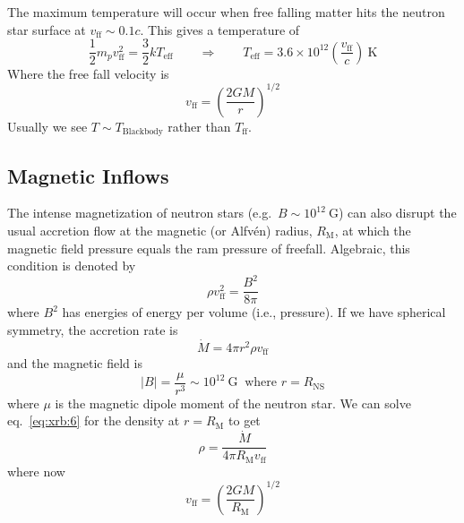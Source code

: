 \documentclass[10pt]{article}
\numberwithin{equation}{section}
\newcommand{\n}{\noindent}
\newcommand{\norm}[1]{\left\lvert#1\right\rvert}
\begin{document}
	\n The maximum temperature will occur when free falling matter hits the neutron star surface at $v_{\mathrm{ff}}\sim 0.1c$. This gives a temperature of
	\begin{equation}
		\label{xrb:3} \frac{1}{2}m_p v_{\mathrm{ff}}^2 = \frac{3}{2}k T_{\mathrm{eff}} \qquad \Rightarrow \qquad T_{\mathrm{eff}} = 3.6\times 10^{12} \left(\frac{v_{\mathrm{ff}}}{c}\right)\ \mathrm{K}
	\end{equation}
	Where the free fall velocity is
	\begin{equation}
		\label{eq:xrb:4} v_{\mathrm{ff}} = \left(\frac{2GM}{r}\right)^{1/2}
	\end{equation}
	Usually we see $T\sim T_{\mathrm{Blackbody}}$ rather than $T_{\mathrm{ff}}$.\\
	
	\subsection{Magnetic Inflows} %
	\label{sub:magnetic_inflows}
	\n The intense magnetization of neutron stars (e.g.\ $B\sim 10^{12}\ \mathrm{G}$) can also disrupt the usual accretion flow at the magnetic (or Alfv\'en) radius, $R_{\mathrm{M}}$, at which the magnetic field pressure equals the ram pressure of freefall. Algebraic, this condition is denoted by
	\begin{equation}
		\label{eq:xrb:5} \rho v_{\mathrm{ff}}^2 = \frac{B^2}{8\pi}
	\end{equation}
	where $B^2$ has energies of energy per volume (i.e., pressure). If we have spherical symmetry, the accretion rate is
	\begin{equation}
		\label{eq:xrb:6} \dot{M} = 4\pi r^2\rho v_{\mathrm{ff}}
	\end{equation}
	and the magnetic field is
	\begin{equation}
		\label{eq:xrb:7} \norm{B} = \frac{\mu}{r^3}\sim 10^{12}\ \mathrm{G} \ \textrm{ where $r=R_{\mathrm{NS}}$}
	\end{equation}
	where $\mu$ is the magnetic dipole moment of the neutron star. We can solve eq.~\eqref{eq:xrb:6} for the density at $r = R_\mathrm{M}$ to get
	\begin{equation}
		\label{eq:xrb:8} \rho = \frac{\dot{M}}{4\pi R_{\mathrm{M}}v_{\mathrm{ff}}}
	\end{equation}
	where now
	\begin{equation}
		\label{eq:xrb:9} v_{\mathrm{ff}} = \left(\frac{2GM}{R_{\mathrm{M}}}\right)^{1/2}
	\end{equation}
\end{document}
